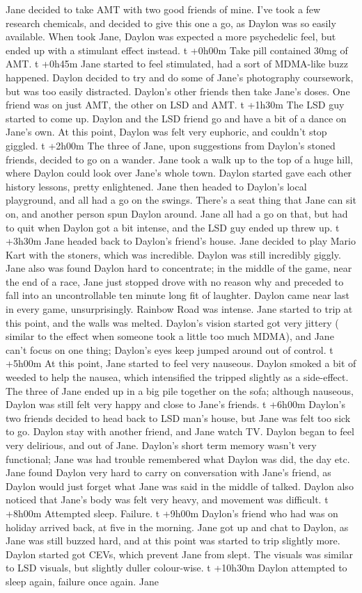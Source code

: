 \documentclass[12pt]{book}
\begin{document}
Jane decided to take AMT with two good friends of mine. I've took a few research chemicals, and decided to give this one a go, as Daylon was so easily available. When took Jane, Daylon was expected a more psychedelic feel, but ended up with a stimulant effect instead. t +0h00m Take pill contained 30mg of AMT. t +0h45m Jane started to feel stimulated, had a sort of MDMA-like buzz happened. Daylon decided to try and do some of Jane's photography coursework, but was too easily distracted. Daylon's other friends then take Jane's doses. One friend was on just AMT, the other on LSD and AMT. t +1h30m The LSD guy started to come up. Daylon and the LSD friend go and have a bit of a dance on Jane's own. At this point, Daylon was felt very euphoric, and couldn't stop giggled. t +2h00m The three of Jane, upon suggestions from Daylon's stoned friends, decided to go on a wander. Jane took a walk up to the top of a huge hill, where Daylon could look over Jane's whole town. Daylon started gave each other history lessons, pretty enlightened. Jane then headed to Daylon's local playground, and all had a go on the swings. There's a seat thing that Jane can sit on, and another person spun Daylon around. Jane all had a go on that, but had to quit when Daylon got a bit intense, and the LSD guy ended up threw up. t +3h30m Jane headed back to Daylon's friend's house. Jane decided to play Mario Kart with the stoners, which was incredible. Daylon was still incredibly giggly. Jane also was found Daylon hard to concentrate; in the middle of the game, near the end of a race, Jane just stopped drove with no reason why and preceded to fall into an uncontrollable ten minute long fit of laughter. Daylon came near last in every game, unsurprisingly. Rainbow Road was intense. Jane started to trip at this point, and the walls was melted. Daylon's vision started got very jittery ( similar to the effect when someone took a little too much MDMA), and Jane can't focus on one thing; Daylon's eyes keep jumped around out of control. t +5h00m At this point, Jane started to feel very nauseous. Daylon smoked a bit of weeded to help the nausea, which intensified the tripped slightly as a side-effect. The three of Jane ended up in a big pile together on the sofa; although nauseous, Daylon was still felt very happy and close to Jane's friends. t +6h00m Daylon's two friends decided to head back to LSD man's house, but Jane was felt too sick to go. Daylon stay with another friend, and Jane watch TV. Daylon began to feel very delirious, and out of Jane. Daylon's short term memory wasn't very functional; Jane was had trouble remembered what Daylon was did, the day etc. Jane found Daylon very hard to carry on conversation with Jane's friend, as Daylon would just forget what Jane was said in the middle of talked. Daylon also noticed that Jane's body was felt very heavy, and movement was difficult. t +8h00m Attempted sleep. Failure. t +9h00m Daylon's friend who had was on holiday arrived back, at five in the morning. Jane got up and chat to Daylon, as Jane was still buzzed hard, and at this point was started to trip slightly more. Daylon started got CEVs, which prevent Jane from slept. The visuals was similar to LSD visuals, but slightly duller colour-wise. t +10h30m Daylon attempted to sleep again, failure once again. Jane 
\end{document}
